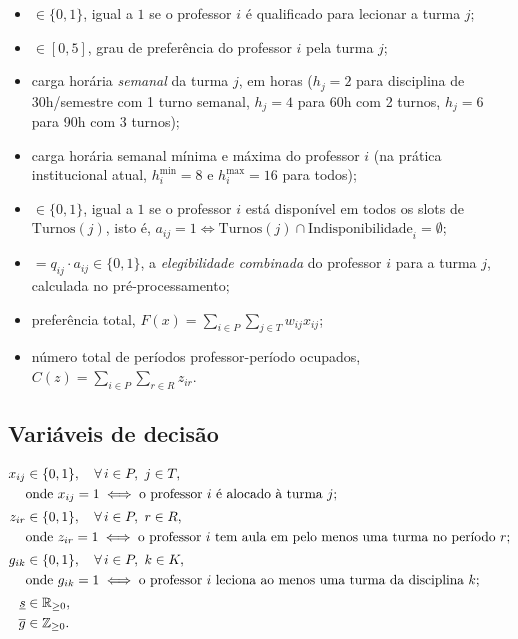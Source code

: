 \documentclass[11pt,a4paper]{article}
\begin{document}
\begin{itemize}[leftmargin=2.2cm]
  \item[$q_{ij}$] $\in \{0,1\}$, igual a $1$ se o professor $i$ é qualificado para lecionar a turma $j$;
  \item[$w_{ij}$] $\in [0,5]$, grau de preferência do professor $i$ pela turma $j$;
  \item[$h_j$] carga horária \emph{semanal} da turma $j$, em horas ($h_j=2$ para disciplina de 30h/semestre com 1 turno semanal, $h_j=4$ para 60h com 2 turnos, $h_j=6$ para 90h com 3 turnos);
  \item[$h_i^{\min}, h_i^{\max}$] carga horária semanal mínima e máxima do professor $i$ (na prática institucional atual, $h_i^{\min}=8$ e $h_i^{\max}=16$ para todos);
  \item[$a_{ij}$] $\in \{0,1\}$, igual a $1$ se o professor $i$ está disponível em todos os slots de $\text{Turnos}(j)$, isto é, $a_{ij}=1 \iff \text{Turnos}(j)\cap\text{Indisponibilidade}_i=\emptyset$;
  \item[$e_{ij}$] $=q_{ij}\cdot a_{ij}\in\{0,1\}$, a \emph{elegibilidade combinada} do professor $i$ para a turma $j$, calculada no pré-processamento;
  \item[$F(x)$] preferência total, $F(x)=\sum_{i\in P}\sum_{j\in T}w_{ij}x_{ij}$;
  \item[$C(z)$] número total de períodos professor-período ocupados, $C(z)=\sum_{i\in P}\sum_{r\in R}z_{ir}$.
\end{itemize}

\subsection{Variáveis de decisão}
\begin{align}
x_{ij} &\in \{0,1\}, \quad \forall\, i \in P,\ j \in T, \notag\\
&\text{onde } x_{ij}=1 \iff \text{o professor }i\text{ é alocado à turma }j; \notag\\[2pt]
z_{ir} &\in \{0,1\}, \quad \forall\, i \in P,\ r \in R, \notag\\
&\text{onde } z_{ir}=1 \iff \text{o professor }i\text{ tem aula em pelo menos uma turma no período }r; \notag\\[2pt]
g_{ik} &\in \{0,1\}, \quad \forall\, i \in P,\ k \in K, \notag\\
&\text{onde } g_{ik}=1 \iff \text{o professor }i\text{ leciona ao menos uma turma da disciplina }k; \notag\\[2pt]
\underline{s} &\in \mathbb{R}_{\geq 0}, \notag\\
\overline{g} &\in \mathbb{Z}_{\geq 0}. \notag
\end{align}
\end{document}
